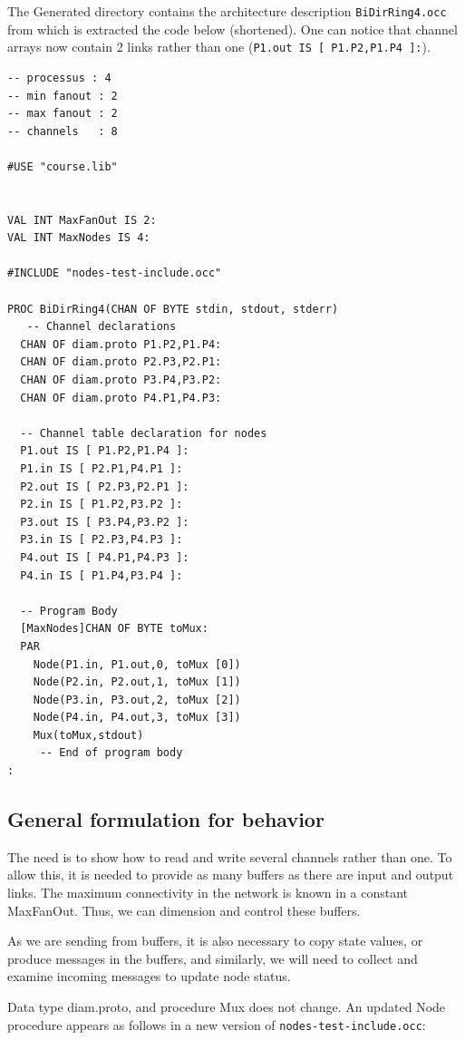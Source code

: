 \documentclass[times]{book}
\begin{document}
The Generated directory contains the architecture description {\tt BiDirRing4.occ} from which is extracted
the code below (shortened). One can notice that channel arrays now contain 2 links rather than one
({\tt   P1.out IS [ P1.P2,P1.P4 ]:}).

\begin{lstlisting} 
-- processus : 4
-- min fanout : 2
-- max fanout : 2
-- channels   : 8
 
#USE "course.lib"


VAL INT MaxFanOut IS 2:
VAL INT MaxNodes IS 4:

#INCLUDE "nodes-test-include.occ"

PROC BiDirRing4(CHAN OF BYTE stdin, stdout, stderr)
   -- Channel declarations
  CHAN OF diam.proto P1.P2,P1.P4:
  CHAN OF diam.proto P2.P3,P2.P1:
  CHAN OF diam.proto P3.P4,P3.P2:
  CHAN OF diam.proto P4.P1,P4.P3:

  -- Channel table declaration for nodes
  P1.out IS [ P1.P2,P1.P4 ]:
  P1.in IS [ P2.P1,P4.P1 ]:
  P2.out IS [ P2.P3,P2.P1 ]:
  P2.in IS [ P1.P2,P3.P2 ]:
  P3.out IS [ P3.P4,P3.P2 ]:
  P3.in IS [ P2.P3,P4.P3 ]:
  P4.out IS [ P4.P1,P4.P3 ]:
  P4.in IS [ P1.P4,P3.P4 ]:

  -- Program Body
  [MaxNodes]CHAN OF BYTE toMux:
  PAR
    Node(P1.in, P1.out,0, toMux [0])
    Node(P2.in, P2.out,1, toMux [1])
    Node(P3.in, P3.out,2, toMux [2])
    Node(P4.in, P4.out,3, toMux [3])
    Mux(toMux,stdout)
     -- End of program body
:
\end{lstlisting} 

\subsection{General formulation for behavior}

The need is to show how to read and write several channels
rather than one. To allow this, it is needed to provide as many buffers
as there are input and output links. The maximum connectivity in
the network is known in a constant MaxFanOut. Thus, we can dimension and
control these buffers.

As we are sending from buffers, it is also necessary to copy state values,
or produce messages in the buffers, and similarly, we will need to collect
and examine incoming messages to update node status.

Data type diam.proto, and procedure Mux does not change.
An updated Node procedure appears as follows in a new version of {\tt nodes-test-include.occ}:
\end{document}
